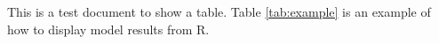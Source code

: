 \documentclass{article}
\begin{document}
This is a test document to show a table. Table \ref{tab:example} is an example of how to display model results from R. 

\end{document}
